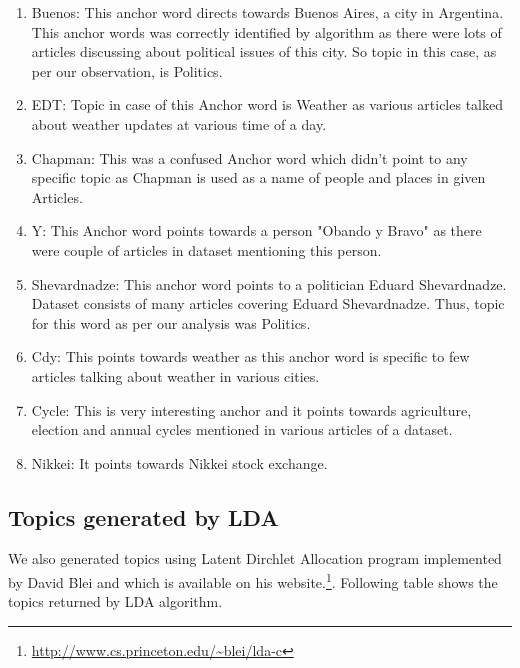 \documentclass[a4paper,11pt]{article}
\begin{document}
\begin{enumerate}
\item Buenos: This anchor word directs towards Buenos Aires, a city in Argentina. This anchor words was correctly identified by algorithm as there were lots of articles discussing about political issues of this city. So topic in this case, as per our observation, is Politics. 

\item EDT: Topic in case of this Anchor word is Weather as various articles talked about weather updates at various time of a day. 

\item Chapman: This was a confused Anchor word which didn't point to any specific topic as Chapman is used as a name of people and places in given Articles. 

\item Y: This Anchor word points towards a person "Obando y Bravo" as there were couple of articles in dataset mentioning this person. 

\item Shevardnadze: This anchor word points to a politician Eduard Shevardnadze. Dataset consists of many articles covering Eduard Shevardnadze. Thus, topic for this word as per our analysis was Politics. 

\item Cdy: This points towards weather as this anchor word is specific to few articles talking about weather in various cities. 

\item Cycle: This is very interesting anchor and it points towards agriculture, election and annual cycles mentioned in various articles of a dataset. 

\item Nikkei: It points towards Nikkei stock exchange. 

\end{enumerate}

\subsection{Topics generated by LDA}
We also generated topics using Latent Dirchlet Allocation program implemented by David Blei and which is available on his website.\footnote{\url{http://www.cs.princeton.edu/~blei/lda-c}}. Following table shows the topics returned by LDA algorithm.  \\
\end{document}
